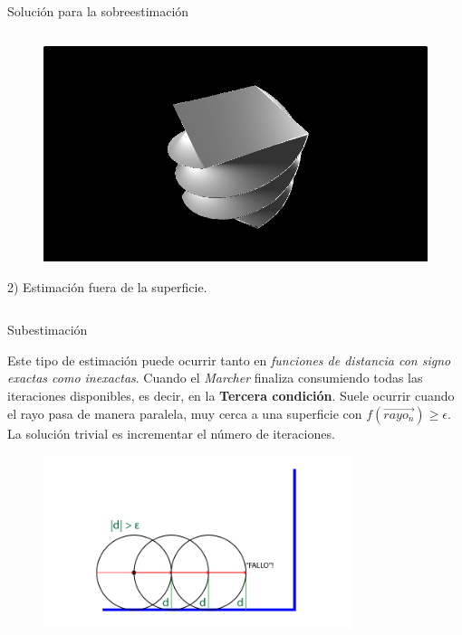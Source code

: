 \begin{frame}{Solución para la sobreestimación}
\begin{columns}[onlytextwidth]
        \begin{column}{0.45\textwidth}
            \begin{figure}[H]
              \centering
              \includegraphics[width=1.0\textwidth]{imagenes/estimation/sobreestimacion_50.png}
            \end{figure}
            {\small 2) Estimación fuera de la superficie.}
        \end{column}
        
    \end{columns}
    
\end{frame}



\begin{frame}{Subestimación}
    
    Este tipo de estimación puede ocurrir tanto en \textit{funciones de distancia con signo exactas como inexactas}. Cuando el \textit{Marcher} finaliza consumiendo todas las iteraciones disponibles, es decir, en la \textbf{Tercera condición}. Suele ocurrir cuando el rayo pasa de manera paralela, muy cerca a una superficie con \(f(\Vec{rayo_{n}}) \ge \epsilon\). La solución trivial es incrementar el número de iteraciones.
    
    \vfill
    
    \begin{figure}[H]
      \centering
      \includegraphics[width=0.8\textwidth]{imagenes/estimation/subestimacion.png}
    \end{figure}
    
\end{frame}